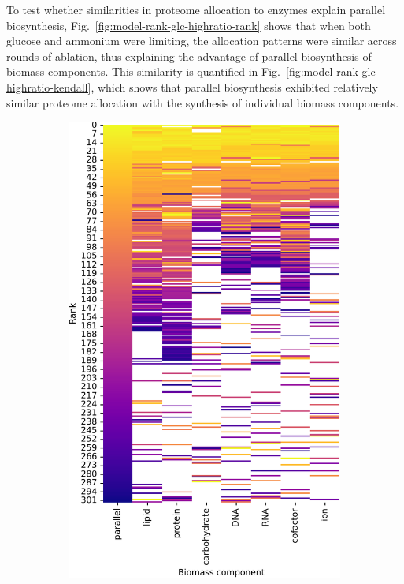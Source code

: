To test whether similarities in proteome allocation to enzymes explain parallel biosynthesis, Fig.\ \ref{fig:model-rank-glc-highratio-rank} shows that when both glucose and ammonium were limiting, the allocation patterns were similar across rounds of ablation, thus explaining the advantage of parallel biosynthesis of biomass components.
This similarity is quantified in Fig.\ \ref{fig:model-rank-glc-highratio-kendall}, which shows that parallel biosynthesis exhibited relatively similar proteome allocation with the synthesis of individual biomass components.

\begin{figure}[htbp!]
  \centering
  \begin{subfigure}[t]{0.45\textwidth}
  \centering
    \includegraphics[width=\linewidth]{CompareEnzUse_glc01p69_pyrUnres_amm01p05_1.pdf}

\end{subfigure}
\end{figure}
